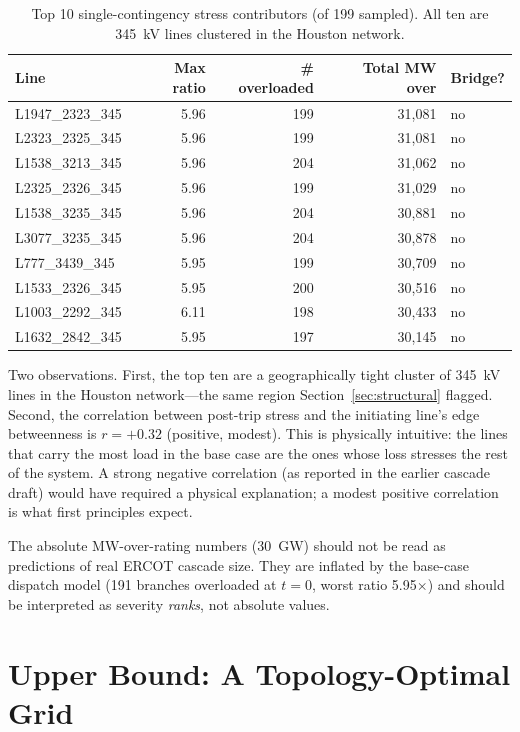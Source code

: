 \documentclass[12pt,letterpaper]{article}
\begin{document}
\begin{table}[h]
\centering
\caption{Top 10 single-contingency stress contributors (of 199 sampled). All ten are 345~kV lines clustered in the Houston network.}
\label{tab:n1}
\begin{tabular}{@{}lrrrl@{}}
\toprule
\textbf{Line} & \textbf{Max ratio} & \textbf{\# overloaded} & \textbf{Total MW over} & \textbf{Bridge?} \\
\midrule
L1947\_2323\_345 & 5.96 & 199 & 31{,}081 & no \\
L2323\_2325\_345 & 5.96 & 199 & 31{,}081 & no \\
L1538\_3213\_345 & 5.96 & 204 & 31{,}062 & no \\
L2325\_2326\_345 & 5.96 & 199 & 31{,}029 & no \\
L1538\_3235\_345 & 5.96 & 204 & 30{,}881 & no \\
L3077\_3235\_345 & 5.96 & 204 & 30{,}878 & no \\
L777\_3439\_345  & 5.95 & 199 & 30{,}709 & no \\
L1533\_2326\_345 & 5.95 & 200 & 30{,}516 & no \\
L1003\_2292\_345 & 6.11 & 198 & 30{,}433 & no \\
L1632\_2842\_345 & 5.95 & 197 & 30{,}145 & no \\
\bottomrule
\end{tabular}
\end{table}

Two observations. First, the top ten are a geographically tight cluster of 345~kV lines in the Houston network---the same region Section~\ref{sec:structural} flagged. Second, the correlation between post-trip stress and the initiating line's edge betweenness is $r = +0.32$ (positive, modest). This is physically intuitive: the lines that carry the most load in the base case are the ones whose loss stresses the rest of the system. A strong negative correlation (as reported in the earlier cascade draft) would have required a physical explanation; a modest positive correlation is what first principles expect.

The absolute MW-over-rating numbers (30~GW) should not be read as predictions of real ERCOT cascade size. They are inflated by the base-case dispatch model (191 branches overloaded at $t=0$, worst ratio 5.95$\times$) and should be interpreted as severity \emph{ranks}, not absolute values.

\section{Upper Bound: A Topology-Optimal Grid}
\label{sec:optimal}
\end{document}
